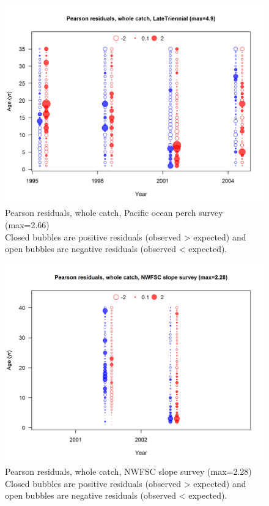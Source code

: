 \documentclass[12pt,]{article}
\begin{document}
\begin{figure}
\centering
\includegraphics{r4ss/plots_mod1/comp_agefit_residsflt4mkt0.png}
\caption{Pearson residuals, whole catch, Pacific ocean perch survey
(max=2.66)\\
Closed bubbles are positive residuals (observed \textgreater{} expected)
and open bubbles are negative residuals (observed \textless{} expected).
\label{fig:pop_age_pearson}}
\end{figure}

\begin{figure}
\centering
\includegraphics{r4ss/plots_mod1/comp_agefit_residsflt7mkt0.png}
\caption{Pearson residuals, whole catch, NWFSC slope survey (max=2.28)\\
Closed bubbles are positive residuals (observed \textgreater{} expected)
and open bubbles are negative residuals (observed \textless{} expected).
\label{fig:nwfsc_age_pearson}}
\end{figure}
\end{document}

